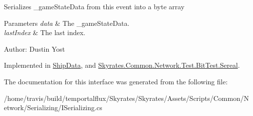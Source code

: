 Serializes \-\_\-game\-State\-Data from this event into a byte array 


\begin{DoxyParams}{Parameters}
{\em data} & The \-\_\-game\-State\-Data.\\
\hline
{\em last\-Index} & The last index.\\
\hline
\end{DoxyParams}


Author\-: Dustin Yost 

Implemented in \hyperlink{class_ship_data_a6207f2504de150eeb3e7407803cbbddb}{Ship\-Data}, and \hyperlink{class_skyrates_1_1_common_1_1_network_1_1_test_1_1_bit_test_1_1_sereal_a67a9e22bccc860f9771c041e92ae9759}{Skyrates.\-Common.\-Network.\-Test.\-Bit\-Test.\-Sereal}.



The documentation for this interface was generated from the following file\-:\begin{DoxyCompactItemize}
\item 
/home/travis/build/temportalflux/\-Skyrates/\-Skyrates/\-Assets/\-Scripts/\-Common/\-Network/\-Serializing/I\-Serializing.\-cs\end{DoxyCompactItemize}
